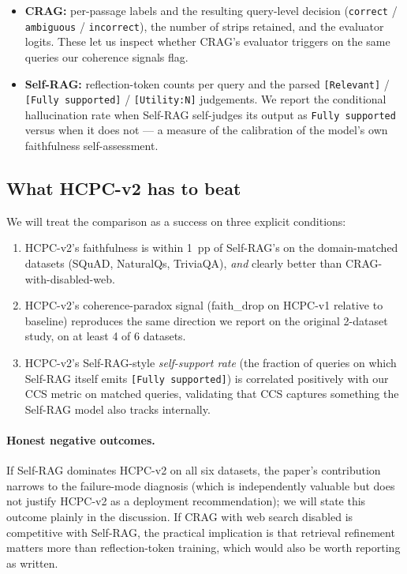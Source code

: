 \begin{itemize}
  \item \textbf{CRAG:} per-passage labels and the resulting query-level
        decision (\texttt{correct} / \texttt{ambiguous} /
        \texttt{incorrect}), the number of strips retained, and the
        evaluator logits. These let us inspect whether CRAG's evaluator
        triggers on the same queries our coherence signals flag.
  \item \textbf{Self-RAG:} reflection-token counts per query and the
        parsed \texttt{[Relevant]} / \texttt{[Fully supported]} /
        \texttt{[Utility:N]} judgements. We report the conditional
        hallucination rate when Self-RAG self-judges its output as
        \texttt{Fully supported} versus when it does not — a measure of
        the calibration of the model's own faithfulness self-assessment.
\end{itemize}

\subsection{What HCPC-v2 has to beat}

We will treat the comparison as a success on three explicit conditions:

\begin{enumerate}
  \item HCPC-v2's faithfulness is within 1~pp of Self-RAG's on the
        domain-matched datasets (SQuAD, NaturalQs, TriviaQA), \emph{and}
        clearly better than CRAG-with-disabled-web.
  \item HCPC-v2's coherence-paradox signal (faith\_drop on HCPC-v1
        relative to baseline) reproduces the same direction we report on
        the original 2-dataset study, on at least 4 of 6 datasets.
  \item HCPC-v2's Self-RAG-style \emph{self-support rate} (the fraction
        of queries on which Self-RAG itself emits \texttt{[Fully
        supported]}) is correlated positively with our CCS metric on
        matched queries, validating that CCS captures something the
        Self-RAG model also tracks internally.
\end{enumerate}

\paragraph{Honest negative outcomes.} If Self-RAG dominates HCPC-v2 on
all six datasets, the paper's contribution narrows to the failure-mode
diagnosis (which is independently valuable but does not justify HCPC-v2
as a deployment recommendation); we will state this outcome plainly in
the discussion. If CRAG with web search disabled is competitive with
Self-RAG, the practical implication is that retrieval refinement matters
more than reflection-token training, which would also be worth reporting
as written.
